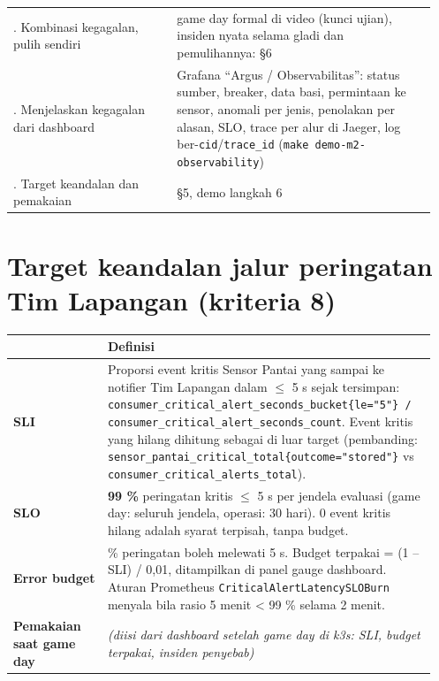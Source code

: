 {\begin{longtable}{@{}>{\raggedright\arraybackslash}p{0.368\linewidth}>{\raggedright\arraybackslash}p{0.578\linewidth}@{}}
6. Kombinasi kegagalan, pulih sendiri & game day formal di video (kunci ujian), insiden nyata selama gladi dan pemulihannya: §6 \\
7. Menjelaskan kegagalan dari dashboard & Grafana ``Argus / Observabilitas'': status sumber, breaker, data basi, permintaan ke sensor, anomali per jenis, penolakan per alasan, SLO, trace per alur di Jaeger, log ber-\texttt{cid}/\texttt{trace\_\allowbreak{}id} (\texttt{make demo-\allowbreak{}m2-\allowbreak{}observability}) \\
8. Target keandalan dan pemakaian & §5, demo langkah 6 \\
\bottomrule
\end{longtable}
}

\section{Target keandalan jalur peringatan Tim Lapangan (kriteria 8)}

{\small
\begin{longtable}{@{}>{\raggedright\arraybackslash}p{0.212\linewidth}>{\raggedright\arraybackslash}p{0.734\linewidth}@{}}
\toprule
\textbf{} & \textbf{Definisi} \\
\midrule
\endhead
\textbf{SLI} & Proporsi event kritis Sensor Pantai yang sampai ke notifier Tim Lapangan dalam $\le$ 5 s sejak tersimpan: \texttt{consumer\_\allowbreak{}critical\_\allowbreak{}alert\_\allowbreak{}seconds\_\allowbreak{}bucket\{le=\allowbreak{}"5"\} /\allowbreak{} consumer\_\allowbreak{}critical\_\allowbreak{}alert\_\allowbreak{}seconds\_\allowbreak{}count}. Event kritis yang hilang dihitung sebagai di luar target (pembanding: \texttt{sensor\_\allowbreak{}pantai\_\allowbreak{}critical\_\allowbreak{}total\{outcome=\allowbreak{}"stored"\}} vs \texttt{consumer\_\allowbreak{}critical\_\allowbreak{}alerts\_\allowbreak{}total}). \\
\textbf{SLO} & \textbf{99 \%} peringatan kritis $\le$ 5 s per jendela evaluasi (game day: seluruh jendela, operasi: 30 hari). 0 event kritis hilang adalah syarat terpisah, tanpa budget. \\
\textbf{Error budget} & 1 \% peringatan boleh melewati 5 s. Budget terpakai = (1 -- SLI) / 0,01, ditampilkan di panel gauge dashboard. Aturan Prometheus \texttt{Critical\allowbreak{}Alert\allowbreak{}Latency\allowbreak{}SLOBurn} menyala bila rasio 5 menit < 99 \% selama 2 menit. \\
\textbf{Pemakaian saat game day} & \emph{(diisi dari dashboard setelah game day di k3s: SLI, budget terpakai, insiden penyebab)} \\
\bottomrule
\end{longtable}
}

